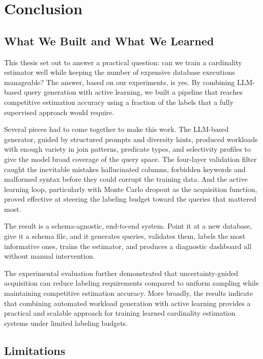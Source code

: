 \chapter{Conclusion}
\label{chap:conclusion}
\pagestyle{plain}

\section{What We Built and What We Learned}

This thesis set out to answer a practical question: can we train a cardinality estimator well while keeping the number of expensive database executions manageable? The answer, based on our experiments, is yes. By combining LLM-based query generation with active learning, we built a pipeline that reaches competitive estimation accuracy using a fraction of the labels that a fully supervised approach would require.

Several pieces had to come together to make this work. The LLM-based generator, guided by structured prompts and diversity hints, produced workloads with enough variety in join patterns, predicate types, and selectivity profiles to give the model broad coverage of the query space. The four-layer validation filter caught the inevitable mistakes hallucinated columns, forbidden keywords and malformed syntax before they could corrupt the training data. And the active learning loop, particularly with Monte Carlo dropout as the acquisition function, proved effective at steering the labeling budget toward the queries that mattered most.

The result is a schema-agnostic, end-to-end system. Point it at a new database, give it a schema file, and it generates queries, validates them, labels the most informative ones, trains the estimator, and produces a diagnostic dashboard all without manual intervention.

The experimental evaluation further demonstrated that uncertainty-guided acquisition can reduce labeling requirements compared to uniform sampling while maintaining competitive estimation accuracy. More broadly, the results indicate that combining automated workload generation with active learning provides a practical and scalable approach for training learned cardinality estimation systems under limited labeling budgets.


\section{Limitations}

